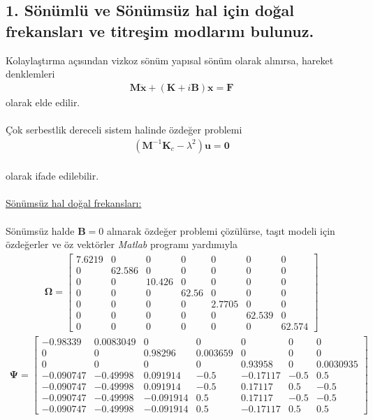 \documentclass[a4paper]{report}
\begin{document}
\subsection*{1.	Sönümlü ve Sönümsüz hal için doğal frekansları ve titreşim modlarını bulunuz.}
Kolaylaştırma açısından vizkoz sönüm yapısal sönüm olarak alınırsa, hareket denklemleri
\begin{eqnarray*}
\mathbf{M} \ddot{\mathbf{x}}+\left(\mathbf{K}+i \mathbf{B}\right)\mathbf{x}=\mathbf{F}
\end{eqnarray*}
olarak elde edilir.\\
~\\
Çok serbestlik dereceli sistem halinde özdeğer problemi
\begin{eqnarray*}
\left(\mathbf{M}^{-1} {\mathbf{{K}}}_c-\lambda^2 \right)\mathbf{u}=\mathbf{0}
\end{eqnarray*}\\
olarak ifade edilebilir. \\
~\\
\underline{Sönümsüz hal doğal frekansları:}\\
~\\
Sönümsüz halde $\mathbf{B}=0$ alınarak özdeğer problemi çözülürse, taşıt modeli için özdeğerler ve öz vektörler \emph{Matlab} programı yardımıyla
\begin{eqnarray*}
\mathbf{\Omega}=\left[\begin{array}{ccccccc} 7.6219 & 0 & 0 & 0 & 0 & 0 & 0\\ 0 & 62.586 & 0 & 0 & 0 & 0 & 0\\ 0 & 0 & 10.426 & 0 & 0 & 0 & 0\\ 0 & 0 & 0 & 62.56 & 0 & 0 & 0\\ 0 & 0 & 0 & 0 & 2.7705 & 0 & 0\\ 0 & 0 & 0 & 0 & 0 & 62.539 & 0\\ 0 & 0 & 0 & 0 & 0 & 0 & 62.574 \end{array}\right]
\end{eqnarray*}
\begin{eqnarray*}
\mathbf{\Psi}=\left[\begin{array}{ccccccc} -0.98339 & 0.0083049 & 0 &0 & 0 & 0 & 0\\ 0 & 0 & 0.98296 & 0.003659 &0 & 0 & 0\\ 0 &0 & 0 & 0 & 0.93958 & 0 & 0.0030935\\ -0.090747 & -0.49998 & 0.091914 & -0.5 & -0.17117 & -0.5 & 0.5\\ -0.090747 & -0.49998 & 0.091914 & -0.5 & 0.17117 & 0.5 & -0.5\\ -0.090747 & -0.49998 & -0.091914 & 0.5 & 0.17117 & -0.5 & -0.5\\ -0.090747 & -0.49998 & -0.091914 & 0.5 & -0.17117 & 0.5 & 0.5 \end{array}\right]
\end{eqnarray*}
\end{document}
